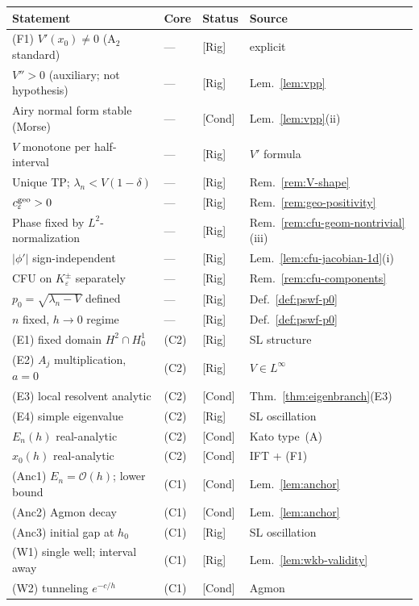 \documentclass[12pt,a4paper]{amsart}
\theoremstyle{definition}
\theoremstyle{remark}
\newcommand{\Rig}{\textup{[Rig]}}
\newcommand{\Cond}{\textup{[Cond]}}
\begin{document}
\begin{center}
\small
\begin{tabular}{lllp{3.5cm}}
\hline
Statement & Core & Status & Source \\
\hline
(F1) $V'(x_0)\ne 0$ (A$_2$ standard) & --- & \Rig & explicit \\
$V''>0$ (auxiliary; not hypothesis) & --- & \Rig & Lem.~\ref{lem:vpp} \\
Airy normal form stable (Morse) & --- & \Cond & Lem.~\ref{lem:vpp}(ii) \\
$V$ monotone per half-interval & --- & \Rig & $V'$ formula \\
Unique TP; $\lambda_n<V(1-\delta)$ & --- & \Rig & Rem.~\ref{rem:V-shape} \\
$c_\varepsilon^{\rm geo}>0$ & --- & \Rig & Rem.~\ref{rem:geo-positivity} \\
Phase fixed by $L^2$-normalization & --- & \Rig & Rem.~\ref{rem:cfu-geom-nontrivial}(iii) \\
$|\phi'|$ sign-independent & --- & \Rig & Lem.~\ref{lem:cfu-jacobian-1d}(i) \\
CFU on $K_\varepsilon^\pm$ separately & --- & \Rig & Rem.~\ref{rem:cfu-components} \\
$p_0=\sqrt{\lambda_n-V}$ defined & --- & \Rig & Def.~\ref{def:pswf-p0} \\
$n$ fixed, $h\to 0$ regime & --- & \Rig & Def.~\ref{def:pswf-p0} \\
(E1) fixed domain $H^2\cap H^1_0$ & (C2) & \Rig & SL structure \\
(E2) $A_j$ multiplication, $a=0$ & (C2) & \Rig & $V\in L^\infty$ \\
(E3) local resolvent analytic & (C2) & \Cond & Thm.~\ref{thm:eigenbranch}(E3) \\
(E4) simple eigenvalue & (C2) & \Rig & SL oscillation \\
$E_n(h)$ real-analytic & (C2) & \Cond & Kato type~(A) \\
$x_0(h)$ real-analytic & (C2) & \Cond & IFT + (F1) \\
(Anc1) $E_n=\mathcal{O}(h)$; lower bound & (C1) & \Cond & Lem.~\ref{lem:anchor} \\
(Anc2) Agmon decay & (C1) & \Cond & Lem.~\ref{lem:anchor} \\
(Anc3) initial gap at $h_0$ & (C1) & \Rig & SL oscillation \\
(W1) single well; interval away & (C1) & \Rig & Lem.~\ref{lem:wkb-validity} \\
(W2) tunneling $e^{-c/h}$ & (C1) & \Cond & Agmon \\

\end{tabular}
\end{center}
\end{document}
